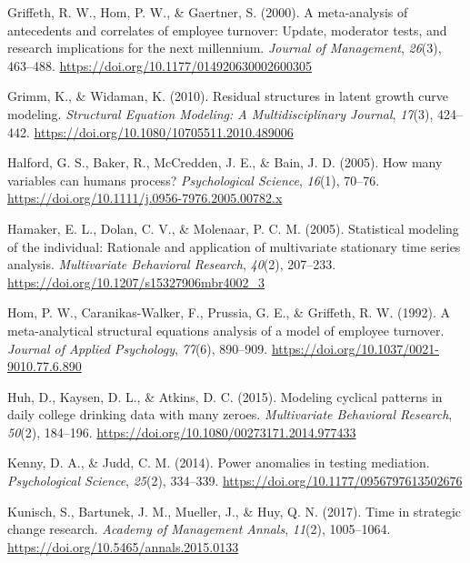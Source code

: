 \documentclass[
  english,
  man,floatsintext]{apa7}
\newlength{\cslhangindent}
\newlength{\cslentryspacingunit} %
\newenvironment{CSLReferences}[2] %
 {%
  \setlength{\parindent}{0pt}
  \ifodd #1
  \let\oldpar\par
  \def\par{\hangindent=\cslhangindent\oldpar}
  \fi
  \setlength{\parskip}{#2\cslentryspacingunit}
 }%
 {}
\begin{document}
\begin{CSLReferences}{1}{0}
\leavevmode{}%
Griffeth, R. W., Hom, P. W., \& Gaertner, S. (2000). A meta-analysis of antecedents and correlates of employee turnover: Update, moderator tests, and research implications for the next millennium. \emph{Journal of Management}, \emph{26}(3), 463--488. \url{https://doi.org/10.1177/014920630002600305}

\leavevmode{}%
Grimm, K., \& Widaman, K. (2010). Residual structures in latent growth curve modeling. \emph{Structural Equation Modeling: A Multidisciplinary Journal}, \emph{17}(3), 424--442. \url{https://doi.org/10.1080/10705511.2010.489006}

\leavevmode{}%
Halford, G. S., Baker, R., McCredden, J. E., \& Bain, J. D. (2005). How many variables can humans process? \emph{Psychological Science}, \emph{16}(1), 70--76. \url{https://doi.org/10.1111/j.0956-7976.2005.00782.x}

\leavevmode{}%
Hamaker, E. L., Dolan, C. V., \& Molenaar, P. C. M. (2005). Statistical modeling of the individual: Rationale and application of multivariate stationary time series analysis. \emph{Multivariate Behavioral Research}, \emph{40}(2), 207--233. \url{https://doi.org/10.1207/s15327906mbr4002_3}

\leavevmode{}%
Hom, P. W., Caranikas-Walker, F., Prussia, G. E., \& Griffeth, R. W. (1992). A meta-analytical structural equations analysis of a model of employee turnover. \emph{Journal of Applied Psychology}, \emph{77}(6), 890--909. \url{https://doi.org/10.1037/0021-9010.77.6.890}

\leavevmode{}%
Huh, D., Kaysen, D. L., \& Atkins, D. C. (2015). Modeling cyclical patterns in daily college drinking data with many zeroes. \emph{Multivariate Behavioral Research}, \emph{50}(2), 184--196. \url{https://doi.org/10.1080/00273171.2014.977433}

\leavevmode{}%
Kenny, D. A., \& Judd, C. M. (2014). Power anomalies in testing mediation. \emph{Psychological Science}, \emph{25}(2), 334--339. \url{https://doi.org/10.1177/0956797613502676}

\leavevmode{}%
Kunisch, S., Bartunek, J. M., Mueller, J., \& Huy, Q. N. (2017). Time in strategic change research. \emph{Academy of Management Annals}, \emph{11}(2), 1005--1064. \url{https://doi.org/10.5465/annals.2015.0133}


\end{CSLReferences}
\end{document}
